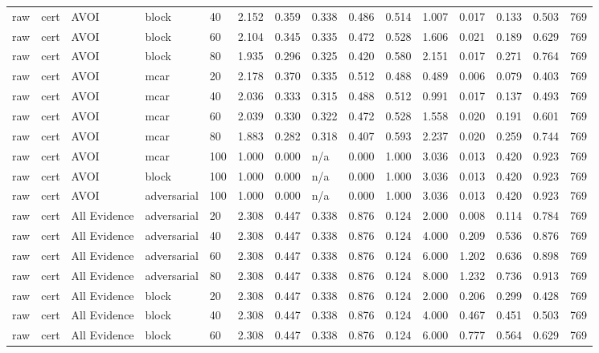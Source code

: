 \begin{table}[!ht]
{\begin{tabular}{lllllllllllllll}
raw & cert & AVOI & block & 40 & 2.152 & 0.359 & 0.338 & 0.486 & 0.514 & 1.007 & 0.017 & 0.133 & 0.503 & 769 \\
raw & cert & AVOI & block & 60 & 2.104 & 0.345 & 0.335 & 0.472 & 0.528 & 1.606 & 0.021 & 0.189 & 0.629 & 769 \\
raw & cert & AVOI & block & 80 & 1.935 & 0.296 & 0.325 & 0.420 & 0.580 & 2.151 & 0.017 & 0.271 & 0.764 & 769 \\
raw & cert & AVOI & mcar & 20 & 2.178 & 0.370 & 0.335 & 0.512 & 0.488 & 0.489 & 0.006 & 0.079 & 0.403 & 769 \\
raw & cert & AVOI & mcar & 40 & 2.036 & 0.333 & 0.315 & 0.488 & 0.512 & 0.991 & 0.017 & 0.137 & 0.493 & 769 \\
raw & cert & AVOI & mcar & 60 & 2.039 & 0.330 & 0.322 & 0.472 & 0.528 & 1.558 & 0.020 & 0.191 & 0.601 & 769 \\
raw & cert & AVOI & mcar & 80 & 1.883 & 0.282 & 0.318 & 0.407 & 0.593 & 2.237 & 0.020 & 0.259 & 0.744 & 769 \\
raw & cert & AVOI & mcar & 100 & 1.000 & 0.000 & n/a & 0.000 & 1.000 & 3.036 & 0.013 & 0.420 & 0.923 & 769 \\
raw & cert & AVOI & block & 100 & 1.000 & 0.000 & n/a & 0.000 & 1.000 & 3.036 & 0.013 & 0.420 & 0.923 & 769 \\
raw & cert & AVOI & adversarial & 100 & 1.000 & 0.000 & n/a & 0.000 & 1.000 & 3.036 & 0.013 & 0.420 & 0.923 & 769 \\
raw & cert & All Evidence & adversarial & 20 & 2.308 & 0.447 & 0.338 & 0.876 & 0.124 & 2.000 & 0.008 & 0.114 & 0.784 & 769 \\
raw & cert & All Evidence & adversarial & 40 & 2.308 & 0.447 & 0.338 & 0.876 & 0.124 & 4.000 & 0.209 & 0.536 & 0.876 & 769 \\
raw & cert & All Evidence & adversarial & 60 & 2.308 & 0.447 & 0.338 & 0.876 & 0.124 & 6.000 & 1.202 & 0.636 & 0.898 & 769 \\
raw & cert & All Evidence & adversarial & 80 & 2.308 & 0.447 & 0.338 & 0.876 & 0.124 & 8.000 & 1.232 & 0.736 & 0.913 & 769 \\
raw & cert & All Evidence & block & 20 & 2.308 & 0.447 & 0.338 & 0.876 & 0.124 & 2.000 & 0.206 & 0.299 & 0.428 & 769 \\
raw & cert & All Evidence & block & 40 & 2.308 & 0.447 & 0.338 & 0.876 & 0.124 & 4.000 & 0.467 & 0.451 & 0.503 & 769 \\
raw & cert & All Evidence & block & 60 & 2.308 & 0.447 & 0.338 & 0.876 & 0.124 & 6.000 & 0.777 & 0.564 & 0.629 & 769 \\

\end{tabular}}
\end{table}
